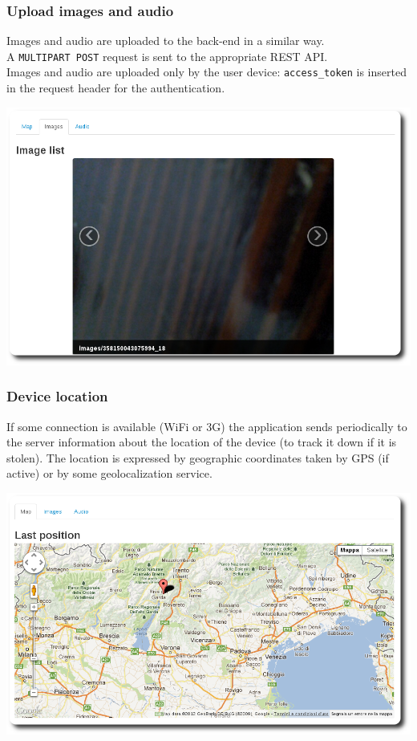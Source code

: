 \documentclass{beamer}
\begin{document}
\begin{frame}
\frametitle{Upload images and audio}
Images and audio are uploaded to the back-end in a similar way.\\
A \texttt{MULTIPART POST} request is sent to the appropriate REST API.\\
Images and audio are uploaded only by the user device: \texttt{access\_token} is inserted in the request header for the authentication.
\begin{center}
\includegraphics[scale=.22]{./../ipermediali/img/slideshow.png}
\end{center}
\end{frame}

\begin{frame}
\frametitle{Device location}
If some connection is available (WiFi or 3G) the application sends periodically to the server information about the location of the device (to track it down if it is stolen). The location is expressed by geographic coordinates taken by GPS (if active) or by some geolocalization service.
\begin{center}
\includegraphics[scale=.22]{./../ipermediali/img/map.png}
\end{center}
\end{frame}
\end{document}
